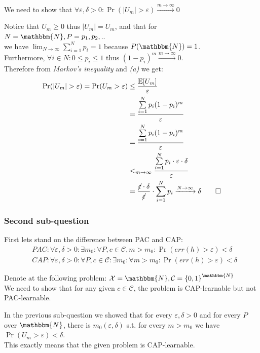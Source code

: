 \documentclass[a4paper]{article}
\newcommand{\lc}{\left\{}
\newcommand{\rc}{\right\}}
\renewcommand{\epsilon}{\varepsilon}
\newcommand{\E}{\mathbb{E}}
\newcommand{\N}{\mathbbm{N}}
\newcommand{\Sum}{\sum\limits_{i=1}^N}
\newcommand{\qedsquare}{\tag*{$\square$}}
\begin{document}
We need to show that $ \forall \epsilon , \delta > 0 : \Pr ( |U_m| > \epsilon ) \xrightarrow{m \to \infty} 0 $

Notice that $ U_m \geq 0 $ thus $ |U_m| = U_m $, and that for $ N=\N , P = { p_1, p_2, .. } $ \\
we have $ \displaystyle \lim_{N \to \infty} \Sum p_i = 1 $ because $ P(\N) = 1 $. \\
Furthermore, $ \forall i \in N : 0 \leq p_i \leq 1 $ thus $ (1-p_i)^m \xrightarrow{m \to \infty} 0 $. \\
Therefore from \textit{Markov's inequality} and \textit{(a)} we get:
\begin{align*}
    \Pr ( |U_m| > \epsilon ) = \Pr ( U_m > \epsilon ) &\leq \frac{\E[U_m]}{\epsilon} \\
    &= \frac{ \Sum p_i ( 1 - p_i ) ^m }{\epsilon} \\
    &= \frac{ \Sum p_i ( 1 - p_i ) ^m }{\epsilon} \\
    &<_{m \to \infty} \frac{ \Sum p_i \cdot \epsilon \cdot \delta }{\epsilon} \\
    &= \frac{ \cancel{\epsilon} \cdot \delta }{\cancel{\epsilon}} \cdot \Sum p_i \xrightarrow{N \to \infty} \delta
    \qedsquare
\end{align*}

\subsubsection {Second sub-question}

First lets stand on the difference between PAC and CAP:
\begin{align*}
    &PAC: \forall \epsilon , \delta > 0 : \exists m_0 : \forall P, c\in\mathcal{C}, m>m_0 : \Pr( err(h) > \epsilon ) <\delta \\
    &CAP: \forall \epsilon , \delta > 0 : \forall P, c\in\mathcal{C} : \exists m_0 :\forall m>m_0 : \Pr( err(h) > \epsilon ) <\delta
\end{align*}

Denote at the following problem: $ \mathcal{X}=\N, \mathcal{C}= \lc 0,1 \rc^{\N} $ \\
We need to show that for any given $ c \in \mathcal{C} $, the problem is CAP-learnable but not PAC-learnable.

In the previous sub-question we showed that for every $ \epsilon, \delta > 0 $ and for every $P$ over $\N$,
there is $ m_0(\epsilon,\delta) $ s.t. for every $ m > m_0 $ we have $ \Pr(U_m > \epsilon) < \delta $. \\
This exactly means that the given problem is CAP-learnable.
\end{document}
